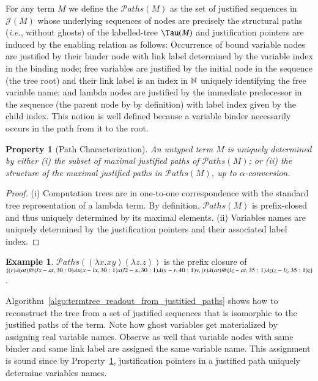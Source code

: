 \documentclass{elsarticle}
\makeatletter
\theoremstyle{plain}
\newtheorem{property}[theorem]{Property}
\theoremstyle{definition}
\newtheorem{example}{Example}[section]
\theoremstyle{remark}
\newcommand{\ctree}{\Tau} %
\newcommand\pathset{{\mathcal{P}aths}} %
\renewcommand\ie{{\it i.e.\@\xspace}}
\def\justseqset{\mathcal{J}}
\makeatother
\begin{document}
For any term $M$ we define the  $\pathset(M)$ as the set of justified sequences in $\justseqset(M)$ whose underlying sequences of nodes are precisely the structural paths (\ie, without ghosts) of the labelled-tree $\ctree(M)$ and justification pointers are induced by the enabling relation as follows: Occurrence of bound variable nodes are justified by their binder node with link label determined by the variable index in the binding node; free variables are justified by the initial node in the sequence (the tree root) and their link label is an index in $\mathbb{N}$ uniquely identifying the free variable name; and lambda nodes are justified by the immediate predecessor in the sequence (the parent node by by definition) with label index given by the child index. This notion is well defined because a variable binder necessarily occurs in the path from it to the root.
\begin{property}[Path Characterization]
\label{prop:tree_path_charact}
 An untyped term $M$ is uniquely determined by either
(i) the subset of maximal justified paths of $\pathset(M)$;
or (ii) the \emph{structure} of the maximal justified paths in $\pathset(M)$, up to $\alpha$-conversion.
\end{property}
\begin{proof}
(i) Computation trees are in one-to-one correspondence with the standard tree representation of a lambda term. By definition, $\pathset(M)$ is prefix-closed and thus uniquely determined by its maximal elements. (ii) Variables names are uniquely determined by the justification pointers and their associated label index.
\end{proof}

\begin{example}
  $\pathset((\lambda x.x y) (\lambda z.z))$ is the prefix closure of
  $\{
  \Pstr{ (r){\lambda} (at){@} (lx-at,30:0){\lambda x} (x-lx,30:1){x} (l2-x,30:1){\lambda} (y-r,40:1){y} },
  \Pstr{ (r){\lambda} (at){@} (lz-at,35:1){\lambda z} (z-lz,35:1){z}}
  \}$.
\end{example}

Algorithm~\ref{algo:termtree_readout_from_justitied_paths} shows how to reconstruct the tree from a set of justified sequences that is isomorphic to the justified paths of the term. Note how ghost variables get materialized by  assigning real variable names. Observe as well that variable nodes with same binder and same link label are assigned the same variable name. This assignment is sound since by Property~\ref{prop:tree_path_charact}, justification pointers in a justified path uniquely determine variables names.
\end{document}
